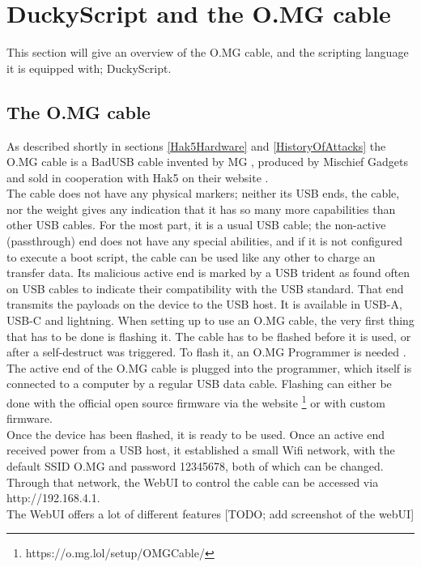 \section{DuckyScript and the O.MG cable}


This section will give an overview of the O.MG cable, and the scripting language it is equipped with; DuckyScript. 

\subsection{The O.MG cable} \label{theOMGCable}

As described shortly in sections \ref{Hak5Hardware} and \ref{HistoryOfAttacks} the O.MG cable is a BadUSB cable invented by MG \cite{MGCable2019a}, produced by Mischief Gadgets \cite{hak5MischiefGadgets} and sold in cooperation with Hak5 on their website \cite{hak5MischiefGadgets}. \\
The cable does not have any physical markers; neither its USB ends, the cable, nor the weight gives any indication that it has so many more capabilities than other USB cables. For the most part, it is a usual USB cable; the non-active (passthrough) end does not have any special abilities, and if it is not configured to execute a boot script, the cable can be used like any other to charge an transfer data. Its malicious active end is marked by a USB trident as found often on USB cables to indicate their compatibility with the USB standard. That end transmits the payloads on the device to the USB host. It is available in USB-A, USB-C and lightning. 
When setting up to use an O.MG cable, the very first thing that has to be done is flashing it. The cable has to be flashed before it is used, or after a self-destruct was triggered. To flash it, an O.MG Programmer is needed \cite{hak5MGCable}. The active end of the O.MG cable is plugged into the programmer, which itself is connected to a computer by a regular USB data cable. Flashing can either be done with the official open source firmware \cite{DuckyScriptSyntaxGuide} via the website \footnote{https://o.mg.lol/setup/OMGCable/} or with custom firmware. \\  
Once the device has been flashed, it is ready to be used. Once an active end received power from a USB host, it established a small Wifi network, with the default SSID O.MG and password 12345678, both of which can be changed. Through that network, the WebUI to control the cable can be accessed via http://192.168.4.1. \\
The WebUI offers a lot of different features [TODO; add screenshot of the webUI]

